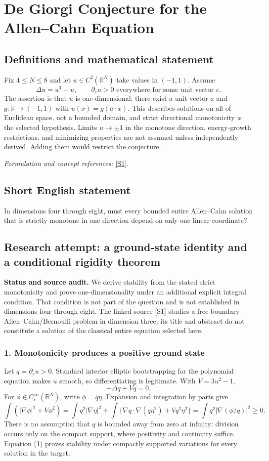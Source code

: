 \documentclass[11pt]{article}
\begin{document}
\section*{\texorpdfstring{De Giorgi Conjecture for the Allen–Cahn Equation}{De Giorgi Conjecture for the Allen–Cahn Equation}}\label{30001256}
\subsection{Definitions and mathematical statement}
Fix $4\le N\le8$ and let $u\in C^2({\mathbb{R}}^N)$ take values in $(-1,1)$. Assume
\[
 \Delta u=u^3-u,\qquad \partial_eu>0\text{ everywhere for some unit vector }e.
\]
The assertion is that $u$ is one-dimensional: there exist a unit vector $a$ and $g:{\mathbb{R}}\to(-1,1)$ with $u(x)=g(a\cdot x)$. This describes solutions on all of Euclidean space, not a bounded domain, and strict directional monotonicity is the selected hypothesis. Limits $u\to\pm1$ in the monotone direction, energy-growth restrictions, and minimizing properties are not assumed unless independently derived. Adding them would restrict the conjecture.
\par\smallskip\textit{Formulation and concept references:} \href{https://arxiv.org/abs/2503.21245}{[S1]}.

\subsection{Short English statement}
In dimensions four through eight, must every bounded entire Allen–Cahn solution that is strictly monotone in one direction depend on only one linear coordinate?
\subsection{Research attempt: a ground-state identity and a conditional rigidity theorem}
\textbf{Status and source audit.} We derive stability from the stated strict monotonicity and prove one-dimensionality under an additional explicit integral condition. That condition is not part of the question and is not established in dimensions four through eight. The linked source [S1] studies a free-boundary Allen--Cahn/Bernoulli problem in dimension three; its title and abstract do not constitute a solution of the classical entire equation selected here.

\subsubsection{1. Monotonicity produces a positive ground state}
Let $q=\partial_eu>0$. Standard interior elliptic bootstrapping for the polynomial equation makes $u$ smooth, so differentiating is legitimate. With $V=3u^2-1$,
\[-\Delta q+Vq=0.\]
For $\phi\in C_c^\infty(\mathbb R^N)$, write $\phi=q\eta$. Expansion and integration by parts give
\[\int (|\nabla\phi|^2+V\phi^2)
=\int q^2|\nabla\eta|^2+\int\{\nabla q\cdot\nabla(q\eta^2)+Vq^2\eta^2\}
=\int q^2|\nabla(\phi/q)|^2\ge0.\tag{1}\]
There is no assumption that $q$ is bounded away from zero at infinity: division occurs only on the compact support, where positivity and continuity suffice. Equation (1) proves stability under compactly supported variations for every solution in the target.
\end{document}
